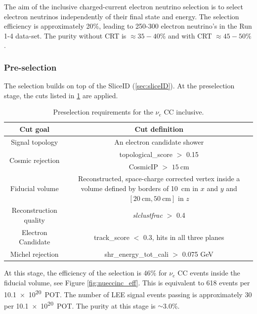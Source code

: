 \label{sec:nueselection:inclusive}

\newcommand{\nueccinc}{$\nu_e$ CC inclusive\xspace}
\newcommand{\nueccsel}{$\nu_e$ CC inclusive selection\xspace}


The aim of the inclusive charged-current electron neutrino selection is to select electron neutrinos independently of their final state and energy. The selection efficiency is approximately 20\%, leading to 250-300 electron neutrino's in the Run 1-4 data-set. The purity without CRT is $\approx 35-40\%$ and with CRT $\approx 45-50\%$.

\subsubsection{Pre-selection}
The selection builds on top of the SliceID (\cref{sec:sliceID}). At the preselection stage,  the cuts listed in \cref{tab:nuecc:presel} are applied. %

\begin{table}[h!]
\centering
\setlength{\tabcolsep}{10pt}
\renewcommand{\arraystretch}{1.25}
 \begin{tabular}{| c | c |} 
 \hline
 Cut goal & Cut definition \\
 \hline\hline
Signal topology & An electron candidate shower \\
 \hline
\multirow{2}{*}{Cosmic rejection} & topological\_score $>$ 0.15 \\
 & CosmicIP $>$ $\SI{15}{\cm}$ \\
 \hline
Fiducial volume & \makecell{Reconstructed, space-charge corrected vertex \\ inside a volume defined by borders of \\ \SI{10}{\cm} in $x$ and $y$ and $[ \SI{20}{\cm}, \SI{50}{\cm}]$ in $z$} \\
 \hline
Reconstruction quality & \textit{slclustfrac} $>$ 0.4 \\
\hline
Electron Candidate &  track\_score $<$ 0.3, hits in all three planes \\
\hline
Michel rejection & shr\_energy\_tot\_cali $>$ 0.075 GeV \\
 \hline
 \end{tabular}
 \caption{\label{tab:nuecc:presel} Preselection requirements for the $\nu_e$ CC inclusive.  }
\end{table}
At this stage, the efficiency of the selection is 46\% for $\nu_e$ CC events inside the fiducial volume, see Figure \ref{fig:nueccinc_eff}. This is equivalent to 618 events per \SI{10.1e20}{POT}. The number of LEE signal events passing is approximately 30 per \SI{10.1e20}{POT}. The purity at this stage is $\sim$3.0\%. 


